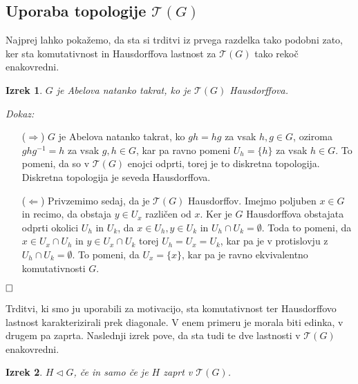 \documentclass[a4paper,12pt]{article}
\def\qed{$\hfill\Box$}   %
\newtheorem{izrek}{Izrek}
\begin{document}
\subsection{Uporaba topologije $\mathcal{T}(G)$}

Najprej lahko pokažemo, da sta si trditvi iz prvega razdelka tako podobni zato, ker sta komutativnost in Hausdorffova lastnost za $\mathcal{T}(G)$ tako rekoč enakovredni.

\begin{izrek}
    $G$ je Abelova natanko takrat, ko je $\mathcal{T}(G)$ Hausdorffova.
\end{izrek}

\noindent
{\em Dokaz:\/}
    \begin{itemize}
        \item[($\Rightarrow$)] $G$ je Abelova natanko takrat, ko $gh = hg $ za vsak $h,g \in G$, oziroma $ghg^{-1} = h$ za vsak $g,h \in G$, kar pa ravno pomeni $U_h = \{ h\}$ za vsak $h \in G$.
        To pomeni, da so v $\mathcal{T}(G)$ enojci odprti, torej je to diskretna topologija. Diskretna topologija je seveda Hausdorffova.
        \item[($\Leftarrow$)] Privzemimo sedaj, da je $\mathcal{T}(G)$ Hausdorffov. Imejmo poljuben $x \in G$ in recimo, da obstaja $y \in U_x$ različen od $x$.
        Ker je $G$ Hausdorffova obstajata odprti okolici $U_h$ in $U_k$, da $x \in U_h, y \in U_k$ in $U_h \cap U_k = \emptyset$.
        Toda to pomeni, da $x \in U_x \cap U_h$ in $y \in U_x \cap U_k$ torej $U_h = U_x = U_k$, kar pa je v protislovju z $U_h \cap U_k = \emptyset$.
        To pomeni, da $U_x = \{x\}$, kar pa je ravno ekvivalentno komutativnosti $G$.
    \end{itemize} 
\qed

Trditvi, ki smo ju uporabili za motivacijo, sta komutativnost ter Hausdorffovo lastnost karakterizirali prek diagonale.
V enem primeru je morala biti edinka, v drugem pa zaprta. Naslednji izrek pove, da sta tudi te dve lastnosti v $\mathcal{T}(G)$ enakovredni.

\begin{izrek}
    $H \triangleleft G$, če in samo če je $H$ zaprt v $\mathcal{T}(G)$.
\end{izrek}
\end{document}
